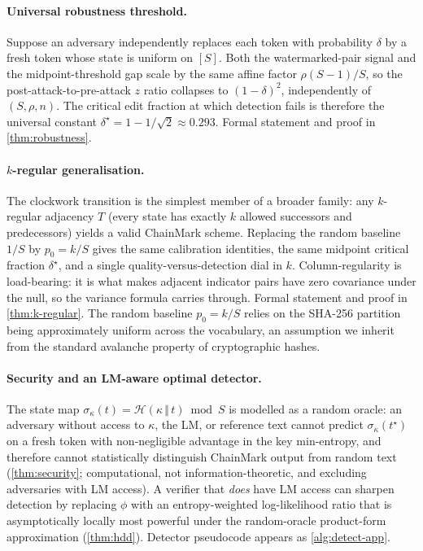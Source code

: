 \paragraph{Universal robustness threshold.}
Suppose an adversary independently replaces each token with
probability $\delta$ by a fresh token whose state is uniform on
$[S]$.  Both the watermarked-pair signal and the
midpoint-threshold gap scale by the same affine factor
$\rho(S{-}1)/S$, so the post-attack-to-pre-attack $z$ ratio collapses
to $(1-\delta)^2$, independently of $(S, \rho, n)$.  The critical
edit fraction at which detection fails is therefore the universal
constant $\delta^\star = 1 - 1/\sqrt{2} \approx 0.293$.  Formal
statement and proof in \autoref{thm:robustness}.

\paragraph{$k$-regular generalisation.}
The clockwork transition is the simplest member of a broader family:
any $k$-regular adjacency $T$ (every state has exactly $k$ allowed
successors and predecessors) yields a valid ChainMark scheme.  Replacing
the random baseline $1/S$ by $p_0 = k/S$ gives the same calibration
identities, the same midpoint critical fraction $\delta^\star$, and a
single quality-versus-detection dial in $k$.  Column-regularity is
load-bearing: it is what makes adjacent indicator pairs have zero
covariance under the null, so the variance formula carries through.
Formal statement and proof in \autoref{thm:k-regular}.  The random
baseline $p_0 = k/S$ relies on the SHA-256 partition being
approximately uniform across the vocabulary, an assumption we
inherit from the standard avalanche property of cryptographic hashes.

\paragraph{Security and an LM-aware optimal detector.}
The state map
$\sigma_\kappa(t) = \mathcal{H}(\kappa \,\Vert\, t) \bmod S$ is
modelled as a random oracle: an adversary without access to $\kappa$,
the LM, or reference text cannot predict $\sigma_\kappa(t^\star)$ on
a fresh token with non-negligible advantage in the key min-entropy,
and therefore cannot statistically distinguish ChainMark output from random
text (\autoref{thm:security}; computational, not
information-theoretic, and excluding adversaries with LM access). A
verifier that \emph{does} have LM access can sharpen detection by
replacing $\phi$ with an entropy-weighted log-likelihood ratio that is
asymptotically locally most powerful under the random-oracle
product-form approximation (\autoref{thm:hdd}). Detector pseudocode
appears as \autoref{alg:detect-app}.

